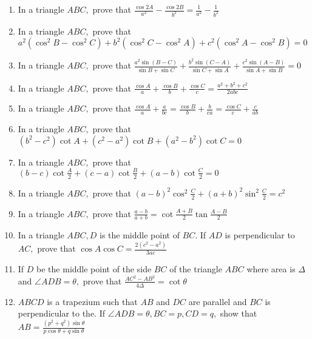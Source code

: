\begin{enumerate}
\item In a triangle $ABC,$ prove that $\frac{\cos2A}{a^2} - \frac{\cos2B}{b^2} = \frac{1}{a^2} - \frac{1}{b^2}$

\item In a triangle $ABC,$ prove that $a^2(\cos^2B - \cos^2C) + b^2(\cos^2C - \cos^2A) + c^2(\cos^2A - \cos^2B) = 0$

\item In a triangle $ABC,$ prove that $\frac{a^2\sin(B - C)}{\sin B + \sin C} + \frac{b^2\sin(C - A)}{\sin C + \sin A} +
    \frac{c^2\sin(A - B)}{\sin A + \sin B} = 0$

\item In a triangle $ABC,$ prove that $\frac{\cos A}{a} + \frac{\cos B}{b} + \frac{\cos C}{c} = \frac{a^2 + b^2 +
    c^2}{2abc}$

\item In a triangle $ABC,$ prove that $\frac{\cos A}{a} + \frac{a}{bc} = \frac{\cos B}{b} + \frac{b}{ca} = \frac{\cos
    C}{c} + \frac{c}{ab}$

\item In a triangle $ABC,$ prove that $(b^2 - c^2)\cot A + (c^2 - a^2)\cot B + (a^2 - b^2)\cot C = 0$

\item In a triangle $ABC,$ prove that $(b - c)\cot\frac{A}{2} + (c - a)\cot\frac{B}{2} + (a - b)\cot\frac{C}{2} = 0$

\item In a triangle $ABC,$ prove that $(a - b)^2\cos^2\frac{C}{2} + (a + b)^2\sin^2\frac{C}{2} = c^2$

\item In a triangle $ABC,$ prove that $\frac{a- b}{a + b} = \cot\frac{A + B}{2}\tan\frac{A - B}{2}$

\item In a triangle $ABC, D$ is the middle point of $BC.$ If $AD$ is perpendicular to $AC,$ prove that
    $\cos A\cos C = \frac{2(c^2 - a^2)}{3ac}$

\item If $D$ be the middle point of the side $BC$ of the triangle $ABC$ where area is $\Delta$ and
    $\angle ADB=\theta,$ prove that $\frac{AC^2 - AB^2}{4\Delta} = \cot\theta$

\item $ABCD$ is a trapezium such that $AB$ and $DC$ are parallel and $BC$ is perpendicular to the. If
    $\angle ADB = \theta, BC = p, CD=q,$ show that $AB = \frac{(p^2 + q^2)\sin\theta}{p\cos\theta + q\sin\theta}$


\end{enumerate}
